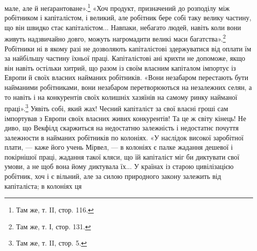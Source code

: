 мале, але й неґарантоване».\footnote{
Там же, т. II, стор. 116.
} «Хоч продукт, призначений до розподілу між робітником і капіталістом,
і великий, але робітник бере собі таку велику частину, що він швидко стає капіталістом... Навпаки,
небагато людей, навіть коли вони живуть надзвичайно довго, можуть нагромадити великі маси
багатства».\footnote{
Там же, т. І, стор. 131.
} Робітники ні в якому разі не дозволяють капіталістові здержуватися від оплати їм за
найбільшу частину їхньої праці. Капіталістові ані крихти не допоможе, якщо він навіть
остільки хитрий, що разом із своїм власним капіталом імпортує із Европи й своїх власних найманих
робітників. «Вони незабаром перестають бути найманими робітниками, вони незабаром перетворюються на
незалежних селян, а то навіть і на конкурентів своїх колишніх хазяїнів на самому ринку найманої
праці».\footnote{
Там же, т. II, стор. 5.
} Уявіть собі, який жах! Чесний капіталіст за свої власні гроші сам імпортував з Европи
своїх власних живих конкурентів! Та це ж світу кінець! Не диво, що Векфілд скаржиться на недостатню
залежність і недостатнє почуття залежности в найманих робітників по колоніях. «У наслідок високої
заробітної плати, — каже його учень Мірвел, — в колоніях є палке жадання дешевої і покірнішої праці,
жадання такої кляси, що їй капіталіст
міг би диктувати свої умови, а не щоб вона йому диктувала їх... У країнах із старою цивілізацією
робітник, хоч і є вільний, але за силою природного закону залежить від капіталіста; в колоніях ця
